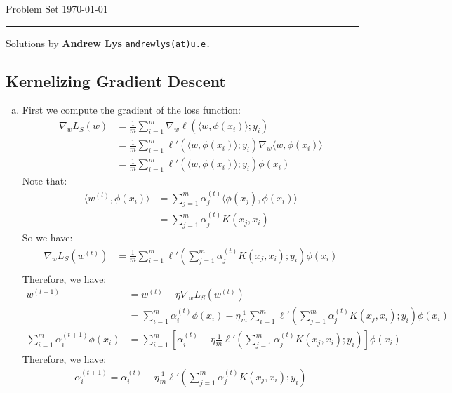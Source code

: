 \documentclass{amsart}
\theoremstyle{definition}
\begin{document}
\noindent
Problem Set   \hfill \today  %
\smallskip
\hrule
\smallskip
\noindent
Solutions by {\bf Andrew Lys} \qquad   %
  {\tt andrewlys(at)u.e.}      %

\vspace{0.5cm}
\subsection{Kernelizing Gradient Descent}
\begin{enumerate}[(a)]
  \item 
    First we compute the gradient of the loss function:
    \begin{align*}
      \nabla_{w} L_S(w) &= \frac{1}{m} \sum_{i=1}^{m} \nabla_{w} \ell(\langle w, \phi(x_i)\rangle; y_i)\\
      &= \frac{1}{m} \sum_{i=1}^{m} \ell'(\langle w, \phi(x_i)\rangle; y_i) \nabla_{w} \langle w, \phi(x_i)\rangle\\
      &= \frac{1}{m} \sum_{i=1}^{m} \ell'(\langle w, \phi(x_i)\rangle; y_i) \phi(x_i)
    \end{align*}
    Note that:
    \begin{align*}
      \langle w^{(t)}, \phi(x_i) \rangle &= \sum_{j=1}^{m} \alpha_j^{(t)} \langle \phi(x_j), \phi(x_i) \rangle\\
      &= \sum_{j=1}^{m} \alpha_j^{(t)} K(x_j, x_i)
    \end{align*}
    So we have:
    \begin{align*}
      \nabla_w L_S(w^{(t)}) &= \frac{1}{m} \sum_{i=1}^{m} \ell'\left(\sum_{j=1}^{m} \alpha_j^{(t)} K(x_j, x_i); y_i\right) \phi(x_i)\\
    \end{align*}
    Therefore, we have:
    \begin{align*}
      w^{(t+1)} &= w^{(t)} - \eta \nabla_w L_S(w^{(t)})\\
      &= \sum_{i=1}^{m} \alpha_i^{(t)} \phi(x_i) - \eta \frac{1}{m} \sum_{i=1}^{m} \ell'\left(\sum_{j=1}^{m} \alpha_j^{(t)} K(x_j, x_i); y_i\right) \phi(x_i)\\
      \sum_{i=1}^{m} \alpha^{(t+1)}_i \phi(x_i)&= \sum_{i=1}^{m} \left[\alpha_i^{(t)} - \eta \frac{1}{m} \ell'\left(\sum_{j=1}^{m} \alpha_j^{(t)} K(x_j, x_i); y_i\right)\right] \phi(x_i)
    \end{align*}
    Therefore, we have:
    \begin{align*}
      \alpha_i^{(t+1)} = \alpha_i^{(t)} - \eta \frac{1}{m} \ell'\left(\sum_{j=1}^{m} \alpha_j^{(t)} K(x_j, x_i); y_i\right)

\end{align*}
\end{enumerate}
\end{document}
